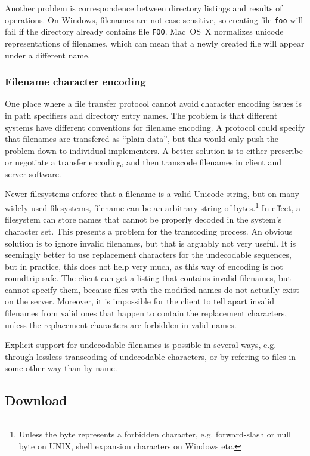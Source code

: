 Another problem is correspondence between directory listings and results of operations. On Windows, filenames
are not case-sensitive, so creating file {\tt foo} will fail if the directory already contains file {\tt FOO}.
Mac~OS~X normalizes unicode representations of filenames, which can mean that a newly created file will appear
under a different name.

\subsubsection{Filename character encoding}

One place where a file transfer protocol cannot avoid character encoding issues is in path specifiers and
directory entry names. The problem is that different systems have different conventions for filename encoding.
A protocol could specify that filenames are transfered as ``plain data'', but this would only push the problem
down to individual implementers. A better solution is to either prescribe or negotiate a transfer encoding,
and then transcode filenames in client and server software.

Newer filesystems enforce that a filename is a valid Unicode string, but on many widely used filesystems,
filename can be an arbitrary string of bytes.\footnote{Unless the byte represents a forbidden character, e.g.
forward-slash or null byte on UNIX, shell expansion characters on Windows etc.} In effect, a filesystem can
store names that cannot be properly decoded in the system's character set. This presents a problem for the
transcoding process.  An obvious solution is to ignore invalid filenames, but that is arguably not very
useful. It is seemingly better to use replacement characters for the undecodable sequences, but in practice,
this does not help very much, as this way of encoding is not roundtrip-safe. The client can get a listing that
contains invalid filenames, but cannot specify them, because files with the modified names do not actually
exist on the server. Moreover, it is impossible for the client to tell apart invalid filenames from valid ones
that happen to contain the replacement characters, unless the replacement characters are forbidden in valid
names.

Explicit support for undecodable filenames is possible in several ways, e.g. through lossless transcoding of
undecodable characters, or by refering to files in some other way than by name.


\subsection{Download}

